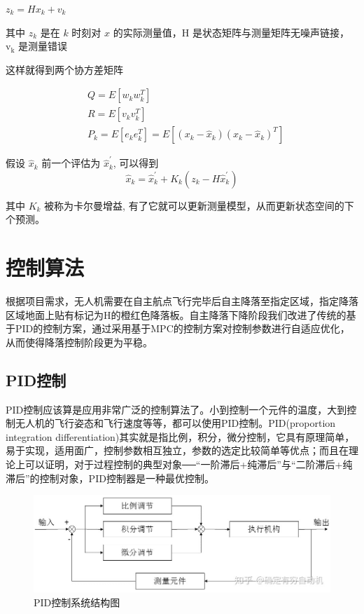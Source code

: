 $z_{k}=H x_{k}+v_{k}$

其中 $z_{k}$ 是在 $k$ 时刻对 $x$ 的实际测量值，$\mathrm{H}$ 是状态矩阵与测量矩阵无噪声链接，$\mathrm{v}_{\mathrm{k}}$ 是测量错误

这样就得到两个协方差矩阵

$$
\begin{aligned}
&Q=E\left[w_{k} w_{k}^{T}\right] \\
&R=E\left[v_{k} v_{k}^{T}\right] \\
&P_{k}=E\left[e_{k} e_{k}^{T}\right]=E\left[\left(x_{k}-\hat{x}_{k}\right)\left(x_{k}-\hat{x}_{k}\right)^{T}\right]
\end{aligned}
$$

假设 $\hat{x}_{k}$ 前一个评估为 $\hat{x}_{k}^{\prime}$, 可以得到
$$
\hat{x}_{k}=\hat{x}_{k}^{\prime}+K_{k}\left(z_{k}-H \hat{x}_{k}^{\prime}\right)
$$

其中 $K_{k}$ 被称为卡尔曼增益, 有了它就可以更新测量模型，从而更新状态空间的下个预测。

\section{控制算法}

根据项目需求，无人机需要在自主航点飞行完毕后自主降落至指定区域，指定降落区域地面上贴有标记为H的橙红色降落板。自主降落下降阶段我们改进了传统的基于PID的控制方案，通过采用基于MPC的控制方案对控制参数进行自适应优化，从而使得降落控制阶段更为平稳。

\subsection{PID控制}

PID控制应该算是应用非常广泛的控制算法了。小到控制一个元件的温度，大到控制无人机的飞行姿态和飞行速度等等，都可以使用PID控制。PID(proportion integration differentiation)其实就是指比例，积分，微分控制，它具有原理简单，易于实现，适用面广，控制参数相互独立，参数的选定比较简单等优点；而且在理论上可以证明，对于过程控制的典型对象──“一阶滞后+纯滞后”与“二阶滞后+纯滞后”的控制对象，PID控制器是一种最优控制。

\begin{figure}[ht]
  \centering
  \includegraphics[width=0.8\linewidth]{./Figure/PID_Graph.jpg}
  \caption{PID控制系统结构图}\label{Fig:xd1}
\end{figure}

